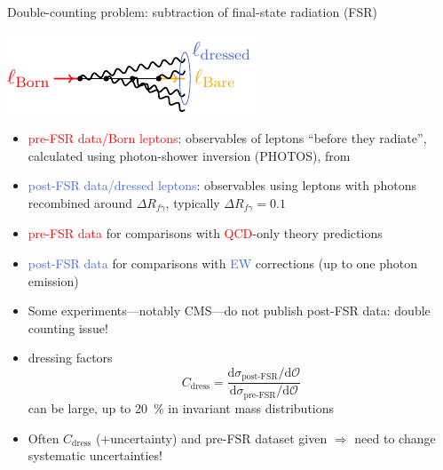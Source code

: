 \begin{frame}{Double-counting problem: subtraction of final-state radiation (FSR)}
\begin{center}
\includegraphics[height=0.2\textheight]{ew_corrections/figures/fd05_photon_radiation}
\end{center}
\begin{itemize}
\item \textcolor{red}{pre-FSR data/Born leptons}: observables of leptons \enquote{before they radiate}, calculated using photon-shower inversion (\textrm{\textsc{PHOTOS}}), from
\item \textcolor{RoyalBlue}{post-FSR data/dressed leptons}: observables using leptons with photons recombined around $\Delta R_{f \gamma}$, typically $\Delta R_{f \gamma} = 0.1$
\end{itemize}
\begin{itemize}
\item \textcolor{red}{pre-FSR data} for comparisons with \textcolor{red}{QCD}-only theory predictions
\item \textcolor{RoyalBlue}{post-FSR data} for comparisons with \textcolor{RoyalBlue}{EW} corrections (up to one photon emission)
\end{itemize}

\vspace*{\fill}

\begin{itemize}
\item Some experiments---notably CMS---do not publish post-FSR data: double counting issue!
\item dressing factors
\begin{equation*}
C_\text{dress} = \frac{\mathrm{d} \sigma_\text{post-FSR} / \mathrm{d} \mathcal{O}}{\mathrm{d} \sigma_\text{pre-FSR} / \mathrm{d} \mathcal{O}}
\end{equation*}
can be large, \alert{up to \SI{20}{\percent}} in invariant mass distributions
\item Often $C_\text{dress}$ (+uncertainty) and pre-FSR dataset given $\Rightarrow$ need to change systematic uncertainties!
\end{itemize}
\end{frame}

